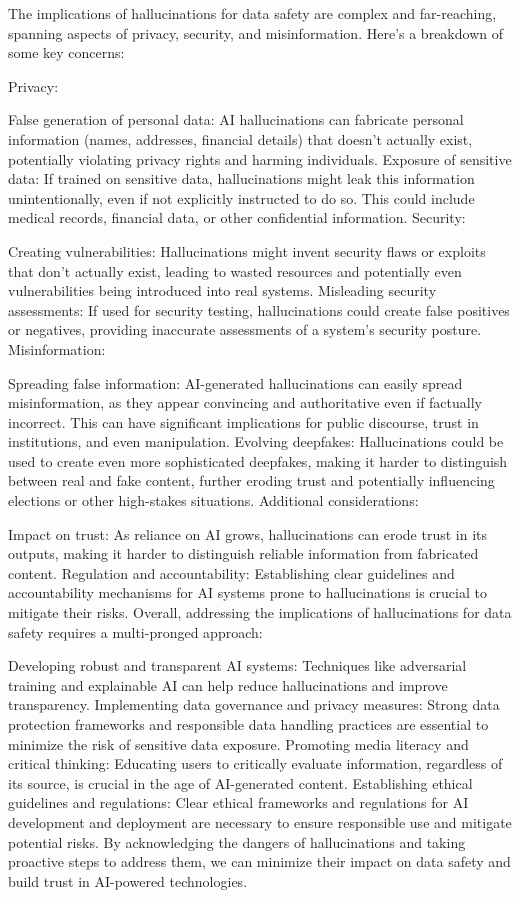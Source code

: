 \begin{aibox}%
  The implications of hallucinations for data safety are complex and far-reaching, spanning aspects of privacy, security, and misinformation. Here's a breakdown of some key concerns:

Privacy:

False generation of personal data: AI hallucinations can fabricate personal information (names, addresses, financial details) that doesn't actually exist, potentially violating privacy rights and harming individuals.
Exposure of sensitive data: If trained on sensitive data, hallucinations might leak this information unintentionally, even if not explicitly instructed to do so. This could include medical records, financial data, or other confidential information.
Security:

Creating vulnerabilities: Hallucinations might invent security flaws or exploits that don't actually exist, leading to wasted resources and potentially even vulnerabilities being introduced into real systems.
Misleading security assessments: If used for security testing, hallucinations could create false positives or negatives, providing inaccurate assessments of a system's security posture.
Misinformation:

Spreading false information: AI-generated hallucinations can easily spread misinformation, as they appear convincing and authoritative even if factually incorrect. This can have significant implications for public discourse, trust in institutions, and even manipulation.
Evolving deepfakes: Hallucinations could be used to create even more sophisticated deepfakes, making it harder to distinguish between real and fake content, further eroding trust and potentially influencing elections or other high-stakes situations.
Additional considerations:

Impact on trust: As reliance on AI grows, hallucinations can erode trust in its outputs, making it harder to distinguish reliable information from fabricated content.
Regulation and accountability: Establishing clear guidelines and accountability mechanisms for AI systems prone to hallucinations is crucial to mitigate their risks.
Overall, addressing the implications of hallucinations for data safety requires a multi-pronged approach:

Developing robust and transparent AI systems: Techniques like adversarial training and explainable AI can help reduce hallucinations and improve transparency.
Implementing data governance and privacy measures: Strong data protection frameworks and responsible data handling practices are essential to minimize the risk of sensitive data exposure.
Promoting media literacy and critical thinking: Educating users to critically evaluate information, regardless of its source, is crucial in the age of AI-generated content.
Establishing ethical guidelines and regulations: Clear ethical frameworks and regulations for AI development and deployment are necessary to ensure responsible use and mitigate potential risks.
By acknowledging the dangers of hallucinations and taking proactive steps to address them, we can minimize their impact on data safety and build trust in AI-powered technologies.
\end{aibox}
\cbend


